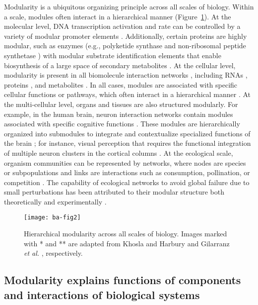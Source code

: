 Modularity is a ubiquitous organizing principle across all scales of biology.
Within a scale, modules often interact in a hierarchical manner (Figure~\ref{fig:ba-fig2}).
At the molecular level, DNA transcription activation and rate can be controlled by a variety of modular promoter elements \citep{dynan1989}.
Additionally, certain proteins are highly modular, such as enzymes (e.g., polyketide synthase and non-ribosomal peptide synthetase \citep{hutchinson2003}) with modular substrate identification elements that enable biosynthesis of a large space of secondary metabolites \citep{khosla2001}.
At the cellular level, modularity is present in all biomolecule interaction networks \citep{mitra2013}, including RNAs \citep{stuart2003}, proteins \citep{spirin2003}, and metabolites \citep{ravasz2002}.
In all cases, modules are associated with specific cellular functions or pathways, which often interact in a hierarchical manner \citep{ravasz2002}.
At the multi-cellular level, organs and tissues are also structured modularly.
For example, in the human brain, neuron interaction networks contain modules associated with specific cognitive functions \citep{sporns2016}.
These modules are hierarchically organized into submodules to integrate and contextualize specialized functions of the brain \citep{meunier2010}; for instance, visual perception that requires the functional integration of multiple neuron clusters in the cortical columns \citep{park2013}.
At the ecological scale, organism communities can be represented by networks, where nodes are species or subpopulations and links are interactions such as consumption, pollination, or competition \citep{grilli2016}.
The capability of ecological networks to avoid global failure due to small perturbations has been attributed to their modular structure both theoretically \citep{grilli2016} and experimentally \citep{gilarranz2017}.
%
\begin{figure}[!t]
  \centering
  \texttt{[image: ba-fig2]}
    \caption[Hierarchical modularity across all scales of biology]{Hierarchical modularity across all scales of biology.
Images marked with * and ** are adapted from Khosla and Harbury
\citep{khosla2001} and Gilarranz \emph{et al.}
    \citep{gilarranz2017}, respectively.}
    \label{fig:ba-fig2}
\end{figure}

\subsection{Modularity explains functions of components and interactions of biological systems}

